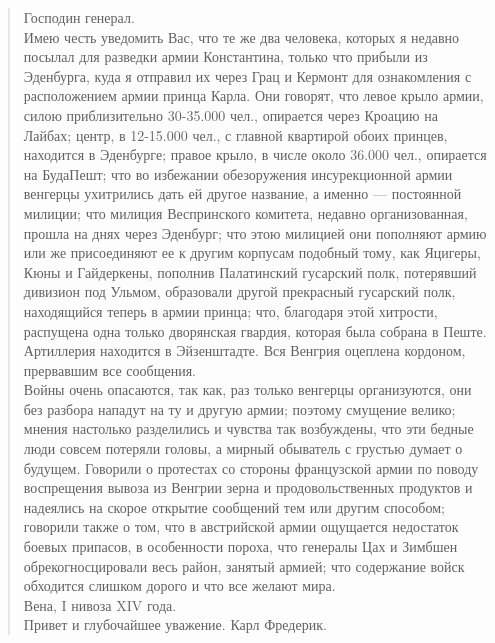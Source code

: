 \documentclass[
  oneside,
  12pt,
  titlepage]{book}
\begin{document}
\begin{quote}
Господин генерал.\\
Имею честь уведомить Вас, что те же два человека, которых я недавно посылал для разведки армии Константина, только что прибыли из Эденбурга, куда я отправил их через Грац и Кермонт для ознакомления с расположением армии принца Карла. Они говорят, что левое крыло армии, силою приблизительно 30-35.000 чел., опирается через Кроацию на Лайбах; центр, в 12-15.000 чел., с главной квартирой обоих принцев, находится в Эденбурге; правое крыло, в числе около 36.000 чел., опирается на БудаПешт; что во избежании обезоружения инсурекционной армии венгерцы ухитрились дать ей другое название, а именно --- постоянной милиции; что милиция Веспринского комитета, недавно организованная, прошла на днях через Эденбург; что этою милицией они пополняют армию или же присоединяют ее к другим корпусам подобный тому, как Яцигеры, Кюны и Гайдеркены, пополнив Палатинский гусарский полк, потерявший дивизион под Ульмом, образовали другой прекрасный гусарский полк, находящийся теперь в армии принца; что, благодаря этой хитрости, распущена одна только дворянская гвардия, которая была собрана в Пеште.\\
Артиллерия находится в Эйзенштадте. Вся Венгрия оцеплена кордоном, прервавшим все сообщения.\\
Войны очень опасаются, так как, раз только венгерцы организуются, они без разбора нападут на ту и другую армии; поэтому смущение велико; мнения настолько разделились и чувства так возбуждены, что эти бедные люди совсем потеряли головы, а мирный обыватель с грустью думает о будущем. Говорили о протестах со стороны французской армии по поводу воспрещения вывоза из Венгрии зерна и продовольственных продуктов и надеялись на скорое открытие сообщений тем или другим способом; говорили также о том, что в австрийской армии ощущается недостаток боевых припасов, в особенности пороха, что генералы Цах и Зимбшен обрекогносцировали весь район, занятый армией; что содержание войск обходится слишком дорого и что все желают мира.\\
Вена, I нивоза XIV года.\\
Привет и глубочайшее уважение. Карл Фредерик.
\end{quote}
\end{document}
